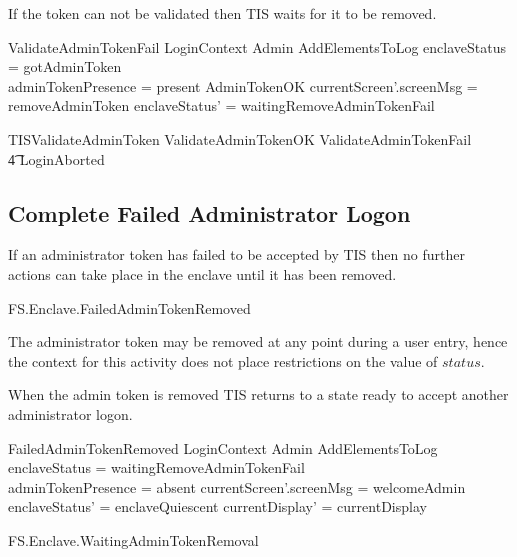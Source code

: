 If the token can not be validated then TIS waits for it to be removed.

\begin{schema}{ValidateAdminTokenFail}
        LoginContext
\also
        \Xi Admin
\also
        AddElementsToLog
\where
        enclaveStatus = gotAdminToken
\\      adminTokenPresence = present
\also
        \lnot AdminTokenOK
\also
        currentScreen'.screenMsg = removeAdminToken
\also
        enclaveStatus' = waitingRemoveAdminTokenFail
\end{schema}

\begin{zed}
        TISValidateAdminToken  ValidateAdminTokenOK \lor
        ValidateAdminTokenFail 
\\ \t4  \lor
        LoginAborted
\end{zed}

\subsection{Complete Failed Administrator Logon}

If an administrator token has failed to be accepted by TIS 
then no further actions can take place in the enclave until it has 
been removed.

\begin{traceunit}{FS.Enclave.FailedAdminTokenRemoved}
\end{traceunit}


The administrator token may be removed at any point during a user
entry, hence the context for this
activity does not place restrictions on the value of $status$.

When the admin token is removed TIS returns to a state ready
to accept another administrator logon.
\begin{schema}{FailedAdminTokenRemoved}
        LoginContext
\also
        \Xi Admin
\also 
        AddElementsToLog
\where
        enclaveStatus = waitingRemoveAdminTokenFail
\\      adminTokenPresence = absent
\also
        currentScreen'.screenMsg = welcomeAdmin
\also
        enclaveStatus' = enclaveQuiescent
\also
        currentDisplay' = currentDisplay
\end{schema}

\begin{traceunit}{FS.Enclave.WaitingAdminTokenRemoval}
\end{traceunit}


